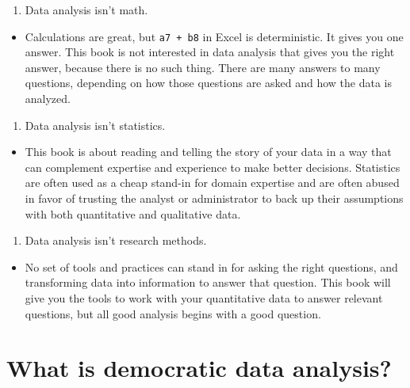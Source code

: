 \documentclass[
]{book}
\providecommand{\tightlist}{%
  \setlength{\itemsep}{0pt}\setlength{\parskip}{0pt}}
\begin{document}
\begin{enumerate}
\def\labelenumi{\arabic{enumi}.}
\tightlist
\item
  Data analysis isn't math.
\end{enumerate}

\begin{itemize}
\tightlist
\item
  Calculations are great, but \texttt{a7\ +\ b8} in Excel is deterministic. It gives you one answer. This book is not interested in data analysis that gives you the right answer, because there is no such thing. There are many answers to many questions, depending on how those questions are asked and how the data is analyzed.
\end{itemize}

\begin{enumerate}
\def\labelenumi{\arabic{enumi}.}
\setcounter{enumi}{1}
\tightlist
\item
  Data analysis isn't statistics.
\end{enumerate}

\begin{itemize}
\tightlist
\item
  This book is about reading and telling the story of your data in a way that can complement expertise and experience to make better decisions. Statistics are often used as a cheap stand-in for domain expertise and are often abused in favor of trusting the analyst or administrator to back up their assumptions with both quantitative and qualitative data.
\end{itemize}

\begin{enumerate}
\def\labelenumi{\arabic{enumi}.}
\setcounter{enumi}{2}
\tightlist
\item
  Data analysis isn't research methods.
\end{enumerate}

\begin{itemize}
\tightlist
\item
  No set of tools and practices can stand in for asking the right questions, and transforming data into information to answer that question. This book will give you the tools to work with your quantitative data to answer relevant questions, but all good analysis begins with a good question.
\end{itemize}

\hypertarget{what-is-democratic-data-analysis}{%
\section{What is democratic data analysis?}\label{what-is-democratic-data-analysis}}
\end{document}
